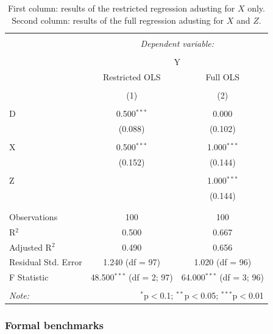 \documentclass[
]{jss}
\begin{document}
\begin{table}
\centering


\begin{tabular}{@{\extracolsep{5pt}}lcc} 
\\[-1.8ex]\hline 
\hline \\[-1.8ex] 
 & \multicolumn{2}{c}{\textit{Dependent variable:}} \\ 
\cline{2-3} 
\\[-1.8ex] & \multicolumn{2}{c}{Y} \\ 
 & Restricted OLS & Full OLS \\ 
\\[-1.8ex] & (1) & (2)\\ 
\hline \\[-1.8ex] 
 D & 0.500$^{***}$ & 0.000 \\ 
  & (0.088) & (0.102) \\ 
  & & \\ 
 X & 0.500$^{***}$ & 1.000$^{***}$ \\ 
  & (0.152) & (0.144) \\ 
  & & \\ 
 Z &  & 1.000$^{***}$ \\ 
  &  & (0.144) \\ 
  & & \\ 
\hline \\[-1.8ex] 
Observations & 100 & 100 \\ 
R$^{2}$ & 0.500 & 0.667 \\ 
Adjusted R$^{2}$ & 0.490 & 0.656 \\ 
Residual Std. Error & 1.240 (df = 97) & 1.020 (df = 96) \\ 
F Statistic & 48.500$^{***}$ (df = 2; 97) & 64.000$^{***}$ (df = 3; 96) \\ 
\hline 
\hline \\[-1.8ex] 
\textit{Note:}  & \multicolumn{2}{r}{$^{*}$p$<$0.1; $^{**}$p$<$0.05; $^{***}$p$<$0.01} \\ 
\end{tabular} 

\caption{First column: results of the restricted regression adusting for $X$ only. Second column: results of the full regression adusting for $X$ and $Z$.}
\label{tab:naive}
\end{table}

\hypertarget{formal-benchmarks}{%
\subsubsection{Formal benchmarks}\label{formal-benchmarks}}
\end{document}
